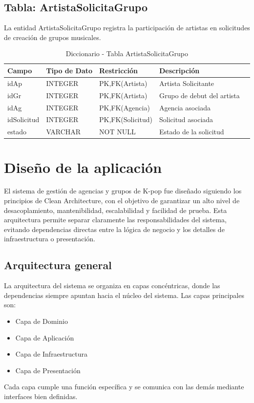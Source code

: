 \documentclass[12pt,a4paper,spanish,oneside]{report}
\begin{document}
\section{Tabla: ArtistaSolicitaGrupo}
La entidad ArtistaSolicitaGrupo registra la participación de artistas en solicitudes de creación de grupos musicales.
\begin{table}[H]
\centering
\caption{Diccionario - Tabla ArtistaSolicitaGrupo}
\begin{tabular}{|l|l|l|l|l|}
\hline
\textbf{Campo} & \textbf{Tipo de Dato} & \textbf{Restricción} & \textbf{Descripción} \\
\hline
idAp & INTEGER & PK,FK(Artista) & Artista Solicitante \\
\hline
idGr & INTEGER & PK,FK(Artista) & Grupo de debut del artista \\
\hline
idAg & INTEGER & PK,FK(Agencia) & Agencia asociada \\
\hline
idSolicitud & INTEGER & PK,FK(Solicitud) & Solicitud asociada \\
\hline
estado & VARCHAR & NOT NULL & Estado de la solicitud \\
\hline
\end{tabular}
\end{table}

\chapter{Diseño de la aplicación}
El sistema de gestión de agencias y grupos de K-pop fue diseñado siguiendo los principios de Clean Architecture, con el objetivo de garantizar un alto nivel de desacoplamiento, mantenibilidad, escalabilidad y facilidad de prueba.
Esta arquitectura permite separar claramente las responsabilidades del sistema, evitando dependencias directas entre la lógica de negocio y los detalles de infraestructura o presentación.
\section{Arquitectura general}
La arquitectura del sistema se organiza en capas concéntricas, donde las dependencias
siempre apuntan hacia el núcleo del sistema. Las capas principales son:
\begin{itemize}
    \item Capa de Dominio
    \item Capa de Aplicación
    \item Capa de Infraestructura
    \item Capa de Presentación
\end{itemize}
Cada capa cumple una función específica y se comunica con las demás mediante interfaces bien definidas.
\end{document}
